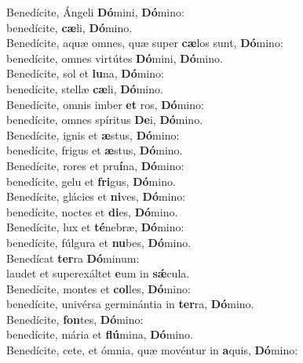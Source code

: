 \evenverse Benedícite, Ángeli \textbf{Dó}mini, \textbf{Dó}mino:~\*\\
\evenverse benedícite, \textbf{cæ}li, \textbf{Dó}mino.\\
\oddverse Benedícite, aquæ omnes, quæ super \textbf{cæ}los sunt, \textbf{Dó}mino:~\*\\
\oddverse benedícite, omnes virtútes \textbf{Dó}mini, \textbf{Dó}mino.\\
\evenverse Benedícite, sol et \textbf{lu}na, \textbf{Dó}mino:~\*\\
\evenverse benedícite, stellæ \textbf{cæ}li, \textbf{Dó}mino.\\
\oddverse Benedícite, omnis imber \textbf{et} ros, \textbf{Dó}mino:~\*\\
\oddverse benedícite, omnes spíritus \textbf{De}i, \textbf{Dó}mino.\\
\evenverse Benedícite, ignis et \textbf{æ}stus, \textbf{Dó}mino:~\*\\
\evenverse benedícite, frigus et \textbf{æ}stus, \textbf{Dó}mino.\\
\oddverse Benedícite, rores et pru\textbf{í}na, \textbf{Dó}mino:~\*\\
\oddverse benedícite, gelu et \textbf{fri}gus, \textbf{Dó}mino.\\
\evenverse Benedícite, glácies et \textbf{ni}ves, \textbf{Dó}mino:~\*\\
\evenverse benedícite, noctes et \textbf{di}es, \textbf{Dó}mino.\\
\oddverse Benedícite, lux et \textbf{té}nebræ, \textbf{Dó}mino:~\*\\
\oddverse benedícite, fúlgura et \textbf{nu}bes, \textbf{Dó}mino.\\
\evenverse Benedícat \textbf{ter}ra \textbf{Dó}minum:~\*\\
\evenverse laudet et superexáltet \textbf{e}um in \textbf{sǽ}cula.\\
\oddverse Benedícite, montes et \textbf{col}les, \textbf{Dó}mino:~\*\\
\oddverse benedícite, univérsa germinántia in \textbf{ter}ra, \textbf{Dó}mino.\\
\evenverse Benedícite, \textbf{fon}tes, \textbf{Dó}mino:~\*\\
\evenverse benedícite, mária et \textbf{flú}mina, \textbf{Dó}mino.\\
\oddverse Benedícite, cete, et ómnia, quæ movéntur in \textbf{a}quis, \textbf{Dó}mino:~\*\\
